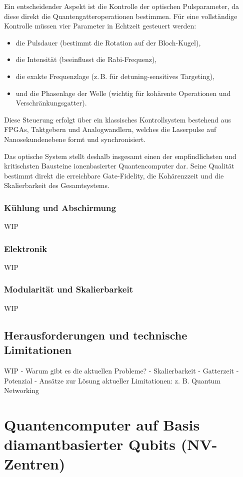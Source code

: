 Ein entscheidender Aspekt ist die Kontrolle der optischen Pulsparameter, da diese direkt die Quantengatteroperationen bestimmen. Für eine vollständige Kontrolle müssen vier Parameter in Echtzeit gesteuert werden:

\begin{itemize}
    \item die Pulsdauer (bestimmt die Rotation auf der Bloch-Kugel),
    \item die Intensität (beeinflusst die Rabi-Frequenz),
    \item die exakte Frequenzlage (z.\,B. für detuning-sensitives Targeting),
    \item und die Phasenlage der Welle (wichtig für kohärente Operationen und Verschränkungsgatter).
\end{itemize}

Diese Steuerung erfolgt über ein klassisches Kontrollsystem bestehend aus FPGAs, Taktgebern und Analogwandlern, welches die Laserpulse auf Nanosekundenebene formt und synchronisiert.

Das optische System stellt deshalb insgesamt einen der empfindlichsten und kritischsten Bausteine ionenbasierter Quantencomputer dar. Seine Qualität bestimmt direkt die erreichbare Gate-Fidelity, die Kohärenzzeit und die Skalierbarkeit des Gesamtsystems.

\subsubsection{Kühlung und Abschirmung}
WIP
\subsubsection{Elektronik}
WIP
\subsubsection{Modularität und Skalierbarkeit}
WIP



\subsection{Herausforderungen und technische Limitationen}
WIP
    - Warum gibt es die aktuellen Probleme?
    - Skalierbarkeit
    - Gatterzeit
    - Potenzial
    - Ansätze zur Lösung aktueller Limitationen: z. B. Quantum Networking 

\section{Quantencomputer auf Basis diamantbasierter Qubits (NV-Zentren)}
